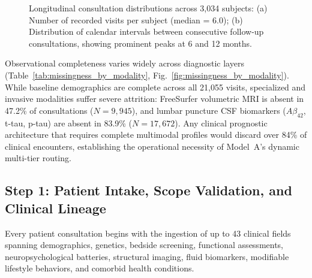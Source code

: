 \documentclass[11pt,a4paper]{article}
\begin{document}
\begin{figure}[t]
\centering
{}
\caption{Longitudinal consultation distributions across 3,034 subjects: (a) Number of recorded visits per subject (median = 6.0); (b) Distribution of calendar intervals between consecutive follow-up consultations, showing prominent peaks at 6 and 12 months.}
\label{fig:visit_distribution}
\end{figure}



Observational completeness varies widely across diagnostic layers (Table~\ref{tab:missingness_by_modality}, Fig.~\ref{fig:missingness_by_modality}). While baseline demographics are complete across all 21,055 visits, specialized and invasive modalities suffer severe attrition: FreeSurfer volumetric MRI is absent in 47.2\% of consultations ($N = 9,945$), and lumbar puncture CSF biomarkers ($A\beta_{42}$, t-tau, p-tau) are absent in 83.9\% ($N = 17,672$). Any clinical prognostic architecture that requires complete multimodal profiles would discard over 84\% of clinical encounters, establishing the operational necessity of Model~A's dynamic multi-tier routing.

\subsection{Step 1: Patient Intake, Scope Validation, and Clinical Lineage}
\label{sec:method_intake}
Every patient consultation begins with the ingestion of up to 43 clinical fields spanning demographics, genetics, bedside screening, functional assessments, neuropsychological batteries, structural imaging, fluid biomarkers, modifiable lifestyle behaviors, and comorbid health conditions.


\end{document}
